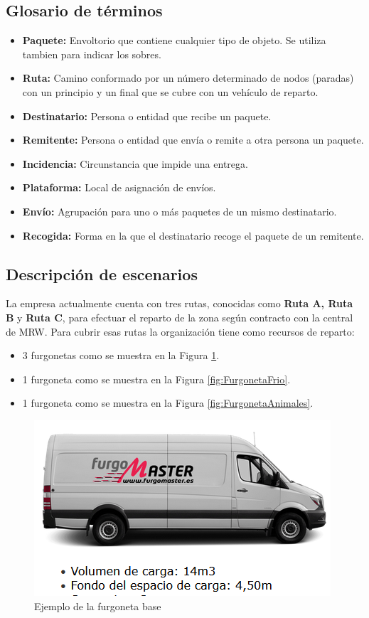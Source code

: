 \subsection{Glosario de términos}
\begin{itemize}
	\item \textbf{Paquete:} Envoltorio que contiene cualquier tipo de objeto. Se utiliza tambien para indicar los sobres.
	\item \textbf{Ruta:} Camino conformado por un número determinado de nodos (paradas) con un principio y un final que se cubre con un vehículo de reparto.  
	\item \textbf{Destinatario:} Persona o entidad que recibe un paquete.
	\item \textbf{Remitente:} Persona o entidad que envía o remite a otra persona un paquete.
	\item \textbf{Incidencia:} Circunstancia que impide una entrega.
	\item \textbf{Plataforma:} Local de asignación de envíos.
	\item \textbf{Envío:} Agrupación para uno o más paquetes de un mismo destinatario.
	\item \textbf{Recogida:} Forma en la que el destinatario recoge el paquete de un remitente.
\end{itemize}

\subsection{Descripción de escenarios}
La empresa actualmente cuenta con tres rutas, conocidas como \textbf{Ruta A, Ruta B} y \textbf{Ruta C}, para efectuar el reparto de la zona según contracto con la central de MRW. Para cubrir esas rutas la organización tiene como recursos de reparto:
\begin{itemize}
  \item 3 furgonetas como se muestra en la Figura \ref{fig:FurgonetaBase}.
  \item 1 furgoneta como se muestra en la Figura \ref{fig:FurgonetaFrio}.
  \item 1 furgoneta como se muestra en la Figura \ref{fig:FurgonetaAnimales}.
\end{itemize}

\begin{figure}[H]
  \centering
  \includegraphics[scale=0.50]{imaxes/FurgonetaBase.png}
  \caption{\label{fig:FurgonetaBase}Ejemplo de la furgoneta base}
\end{figure}

